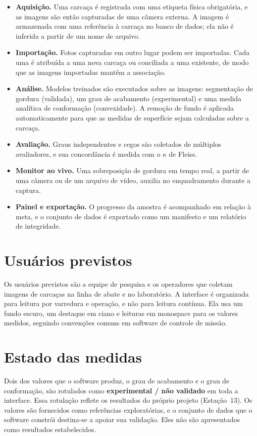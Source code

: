 \begin{itemize}[leftmargin=1.3em,itemsep=3pt]
  \item \textbf{Aquisição.} Uma carcaça é registrada com uma etiqueta física
        obrigatória, e as imagens são então capturadas de uma câmera externa. A
        imagem é armazenada com uma referência à carcaça no banco de dados; ela não
        é inferida a partir de um nome de arquivo.
  \item \textbf{Importação.} Fotos capturadas em outro lugar podem ser importadas.
        Cada uma é atribuída a uma nova carcaça ou conciliada a uma existente, de
        modo que as imagens importadas mantêm a associação.
  \item \textbf{Análise.} Modelos treinados são executados sobre as imagens:
        segmentação de gordura (validada), um grau de acabamento (experimental) e
        uma medida analítica de conformação (convexidade). A remoção de fundo é
        aplicada automaticamente para que as medidas de superfície sejam calculadas
        sobre a carcaça.
  \item \textbf{Avaliação.} Graus independentes e cegos são coletados de múltiplos
        avaliadores, e sua concordância é medida com o $\kappa$ de Fleiss.
  \item \textbf{Monitor ao vivo.} Uma sobreposição de gordura em tempo real, a
        partir de uma câmera ou de um arquivo de vídeo, auxilia no enquadramento
        durante a captura.
  \item \textbf{Painel e exportação.} O progresso da amostra é acompanhado em
        relação à meta, e o conjunto de dados é exportado como um manifesto e um
        relatório de integridade.
\end{itemize}

\section{Usuários previstos}

Os usuários previstos são a equipe de pesquisa e os operadores que coletam imagens
de carcaças na linha de abate e no laboratório. A interface é organizada para
leitura por varredura e operação, e não para leitura contínua. Ela usa um fundo
escuro, um destaque em ciano e leituras em monospace para os valores medidos,
seguindo convenções comuns em software de controle de missão.

\section{Estado das medidas}

Dois dos valores que o software produz, o grau de acabamento e o grau de
conformação, são rotulados como \textbf{experimental / não validado} em toda a
interface. Essa rotulação reflete os resultados do próprio projeto (Estação~13).
Os valores são fornecidos como referências exploratórias, e o conjunto de dados
que o software constrói destina-se a apoiar sua validação. Eles não são
apresentados como resultados estabelecidos.
